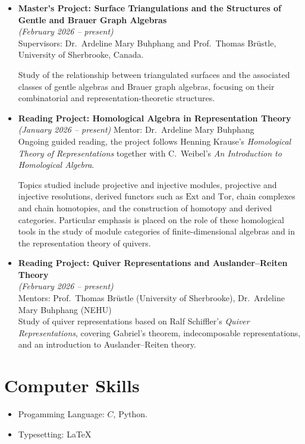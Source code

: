 \documentclass[11pt]{article}
\begin{document}
\begin{itemize}[leftmargin=*, itemsep=0.6em]

\item \textbf{Master's Project: Surface Triangulations and the Structures of Gentle and Brauer Graph Algebras} \\
\textit{(February 2026 -- present)} \\
Supervisors: Dr.~Ardeline Mary Buhphang and Prof.~Thomas Br\"{u}stle, University of Sherbrooke, Canada.

\vspace{3mm}

Study of the relationship between triangulated surfaces and the associated classes of gentle algebras and Brauer graph algebras, focusing on their combinatorial and representation-theoretic structures.

\item \textbf{Reading Project: Homological Algebra in Representation Theory} \\
\textit{(January 2026 -- present)} \hfill Mentor: Dr.~Ardeline Mary Buhphang \\

Ongoing guided reading, the project follows Henning Krause's
\textit{Homological Theory of Representations} together with C.~Weibel's
\textit{An Introduction to Homological Algebra}. 

Topics studied include projective and injective modules, projective and injective
resolutions, derived functors such as $\mathrm{Ext}$ and $\mathrm{Tor}$, chain
complexes and chain homotopies, and the construction of homotopy and derived
categories. Particular emphasis is placed on the role of these homological tools
in the study of module categories of finite-dimensional algebras and in the
representation theory of quivers.

\item \textbf{Reading Project: Quiver Representations and Auslander--Reiten Theory} \\
\textit{(February 2026 -- present)} \\ \hfill Mentors: Prof.~Thomas Br\"ustle (University of Sherbrooke), Dr.~Ardeline Mary Buhphang (NEHU) \\

Study of quiver representations based on Ralf Schiffler's \textit{Quiver Representations}, covering Gabriel's theorem, indecomposable representations, and an introduction to Auslander--Reiten theory.

\end{itemize}

\section*{Computer Skills}
\begin{itemize}
    \item Progamming Language: $C$, Python.
    \item Typesetting: \LaTeX
\end{itemize}
\end{document}
